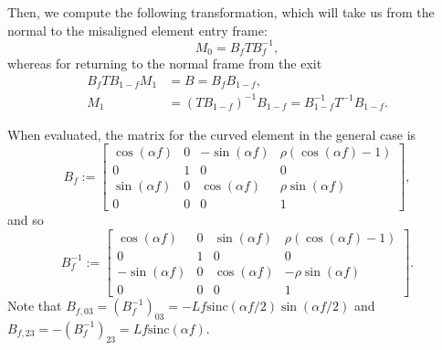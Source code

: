 Then, we compute the following transformation, which will take us from the normal to the misaligned element entry frame:
\[
	M_0 = B_f T B_f^{-1},
\]
whereas for returning to the normal frame from the exit
\[
	\begin{aligned}
		B_f T B_{1 - f} M_1 &= B = B_f B_{1-f}, \\
		M_1 &= (T B_{1 - f})^{-1} B_{1-f} = B_{1 - f}^{-1} T^{-1} B_{1-f}.
	\end{aligned}
\]

When evaluated, the matrix for the curved element in the general case is
\[
	B_f := \begin{bmatrix}
		\cos\left(\alpha f\right) & 0 & -\sin\left(\alpha f\right) & \rho (\cos\left(\alpha f\right) - 1) \\
		0 & 1 & 0 & 0 \\
		\sin\left(\alpha f\right) & 0 & \cos\left(\alpha f\right) & \rho \sin(\alpha f) \\
		0 & 0 & 0 & 1
	\end{bmatrix},
\]
and so
\[
	B_f^{-1} := \begin{bmatrix}
			\cos\left(\alpha f\right) & 0 & \sin\left(\alpha f\right) & \rho (\cos\left(\alpha f\right) - 1) \\
		0 & 1 & 0 & 0 \\
		-\sin\left(\alpha f\right) & 0 & \cos\left(\alpha f\right) & - \rho \sin(\alpha f) \\
		0 & 0 & 0 & 1
		\end{bmatrix}.
\]
Note that $B_{f,03} = (B_f^{-1})_{03} = -L f \mathrm{sinc}(\alpha f / 2) \sin(\alpha f / 2)$ and $B_{f,23} = -(B_f^{-1})_{23} = L f \mathrm{sinc}(\alpha f)$.


